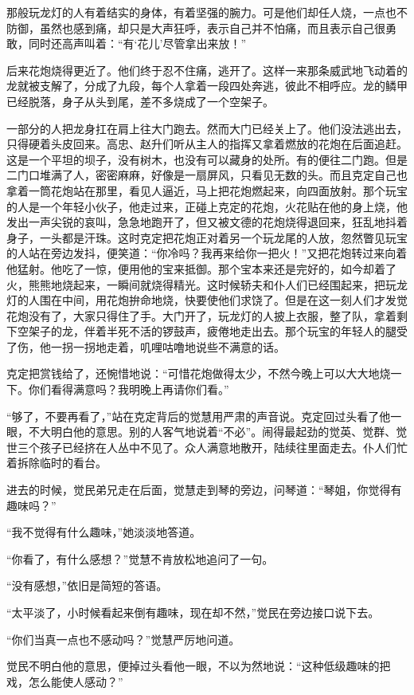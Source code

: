 \par 那般玩龙灯的人有着结实的身体，有着坚强的腕力。可是他们却任人烧，一点也不防御，虽然也感到痛，却只是大声狂呼，表示自己并不怕痛，而且表示自己很勇敢，同时还高声叫着：“有‘花儿’尽管拿出来放！”
\par 后来花炮烧得更近了。他们终于忍不住痛，逃开了。这样一来那条威武地飞动着的龙就被支解了，分成了九段，每个人拿着一段四处奔逃，彼此不相呼应。龙的鳞甲已经脱落，身子从头到尾，差不多烧成了一个空架子。
\par 一部分的人把龙身扛在肩上往大门跑去。然而大门已经关上了。他们没法逃出去，只得硬着头皮回来。高忠、赵升们听从主人的指挥又拿着燃放的花炮在后面追赶。这是一个平坦的坝子，没有树木，也没有可以藏身的处所。有的便往二门跑。但是二门口堆满了人，密密麻麻，好像是一扇屏风，只看见无数的头。而且克定自己也拿着一筒花炮站在那里，看见人逼近，马上把花炮燃起来，向四面放射。那个玩宝的人是一个年轻小伙子，他走过来，正碰上克定的花炮，火花贴在他的身上烧，他发出一声尖锐的哀叫，急急地跑开了，但又被文德的花炮烧得退回来，狂乱地抖着身子，一头都是汗珠。这时克定把花炮正对着另一个玩龙尾的人放，忽然瞥见玩宝的人站在旁边发抖，便笑道：“你冷吗？我再来给你一把火！”又把花炮转过来向着他猛射。他吃了一惊，便用他的宝来抵御。那个宝本来还是完好的，如今却着了火，熊熊地烧起来，一瞬间就烧得精光。这时候轿夫和仆人们已经围起来，把玩龙灯的人围在中间，用花炮拚命地烧，快要使他们求饶了。但是在这一刻人们才发觉花炮没有了，大家只得住了手。大门开了，玩龙灯的人披上衣服，整了队，拿着剩下空架子的龙，伴着半死不活的锣鼓声，疲倦地走出去。那个玩宝的年轻人的腿受了伤，他一拐一拐地走着，叽哩咕噜地说些不满意的话。
\par 克定把赏钱给了，还惋惜地说：“可惜花炮做得太少，不然今晚上可以大大地烧一下。你们看得满意吗？我明晚上再请你们看。”
\par “够了，不要再看了，”站在克定背后的觉慧用严肃的声音说。克定回过头看了他一眼，不大明白他的意思。别的人客气地说着“不必”。闹得最起劲的觉英、觉群、觉世三个孩子已经挤在人丛中不见了。众人满意地散开，陆续往里面走去。仆人们忙着拆除临时的看台。
\par 进去的时候，觉民弟兄走在后面，觉慧走到琴的旁边，问琴道：“琴姐，你觉得有趣味吗？”
\par “我不觉得有什么趣味，”她淡淡地答道。
\par “你看了，有什么感想？”觉慧不肯放松地追问了一句。
\par “没有感想，”依旧是简短的答语。
\par “太平淡了，小时候看起来倒有趣味，现在却不然，”觉民在旁边接口说下去。
\par “你们当真一点也不感动吗？”觉慧严厉地问道。
\par 觉民不明白他的意思，便掉过头看他一眼，不以为然地说：“这种低级趣味的把戏，怎么能使人感动？”
